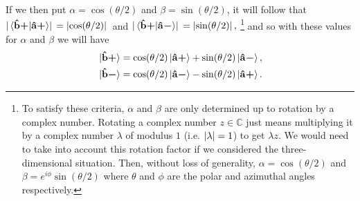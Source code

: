 \documentclass[letter, 12pt]{turabian-thesis}
\theoremstyle{hypothesis}
\newcommand{\uvb}[1]{\vb{\hat{{#1}}}}
\newcommand{\uvbp}[1]{\uvb{#1}\bm{+}}
\newcommand{\uvbm}[1]{\uvb{#1}\bm{-}}
\let\origfootnote\footnote %
\renewcommand{\footnote}[1]{%
\noindent %
\origfootnote{#1}}
\begin{document}
If we then put  $\alpha=\cos(\theta/2)$ and $\beta=\sin(\theta/2)$, it will follow that $\abs*{\ip*{\uvbp{b}}{\uvbp{a}}}=\abs*{\cos(\theta/2)}$ and  $\abs*{\ip*{\uvbp{b}}{\uvbm{a}}}=\abs*{\sin(\theta/2)},$\footnote{To satisfy these criteria, $\alpha$ and $\beta$ are only determined up to rotation by a complex number. Rotating a complex number $z\in\mathbb{C}$ just means multiplying it by a complex number $\lambda$ of modulus $1$ (i.e. $\abs{\lambda}=1$) to get $\lambda z$. We would need to take into account this rotation factor if we considered the three-dimensional situation. Then, without loss of generality, $\alpha=\cos(\theta/2)$ and $\beta=e^{i\phi}\sin(\theta/2)$ where $\theta$ and $\phi$ are the polar and azimuthal angles respectively.} and so with these values for $\alpha$ and $\beta$ we will have
\begin{subequations}\label{spintrans}
\begin{align}
\ket*{\uvbp{b}}&= \cos(\theta/2)\ket*{\uvbp{a}}+\sin(\theta/2) \ket*{\uvbm{a}},\label{spintrans1}\\
\ket*{\uvbm{b}}&= \cos(\theta/2)\ket*{\uvbm{a}}-\sin(\theta/2) \ket*{\uvbp{a}}.\label{spintrans2}
\end{align}
\end{subequations}
\end{document}
